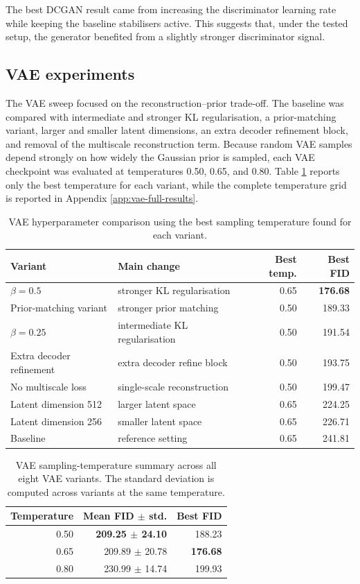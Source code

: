 \documentclass[11pt,a4paper]{article}
\begin{document}
The best DCGAN result came from increasing the discriminator learning rate while keeping the baseline stabilisers active. This suggests that, under the tested setup, the generator benefited from a slightly stronger discriminator signal.

\subsection{VAE experiments}

The VAE sweep focused on the reconstruction--prior trade-off.
The baseline was compared with intermediate and stronger KL regularisation, a prior-matching variant, larger and smaller latent dimensions, an extra decoder refinement block, and removal of the multiscale reconstruction term.
Because random VAE samples depend strongly on how widely the Gaussian prior is sampled, each VAE checkpoint was evaluated at temperatures 0.50, 0.65, and 0.80.
Table \ref{tab:vae-hparam} reports only the best temperature for each variant, while the complete temperature grid is reported in Appendix \ref{app:vae-full-results}.

\begin{table}[H]
\centering
\caption{VAE hyperparameter comparison using the best sampling temperature found for each variant.}
\label{tab:vae-hparam}
\begin{tabular}{llrr}
\toprule
Variant & Main change & Best temp. & Best FID \\
\midrule
$\beta=0.5$ & stronger KL regularisation & 0.65 & \textbf{176.68} \\
Prior-matching variant & stronger prior matching & 0.50 & 189.33 \\
$\beta=0.25$ & intermediate KL regularisation & 0.50 & 191.54 \\
Extra decoder refinement & extra decoder refine block & 0.50 & 193.75 \\
No multiscale loss & single-scale reconstruction & 0.50 & 199.47 \\
Latent dimension 512 & larger latent space & 0.65 & 224.25 \\
Latent dimension 256 & smaller latent space & 0.65 & 226.71 \\
Baseline & reference setting & 0.65 & 241.81 \\
\bottomrule
\end{tabular}
\end{table}

\begin{table}[H]
\centering
\caption{VAE sampling-temperature summary across all eight VAE variants. The standard deviation is computed across variants at the same temperature.}
\label{tab:vae-temp-summary}
\begin{tabular}{rrr}
\toprule
Temperature & Mean FID $\pm$ std. & Best FID \\
\midrule
0.50 & \textbf{209.25 $\pm$ 24.10} & 188.23 \\
0.65 & 209.89 $\pm$ 20.78 & \textbf{176.68} \\
0.80 & 230.99 $\pm$ 14.74 & 199.93 \\
\bottomrule
\end{tabular}
\end{table}
\end{document}
